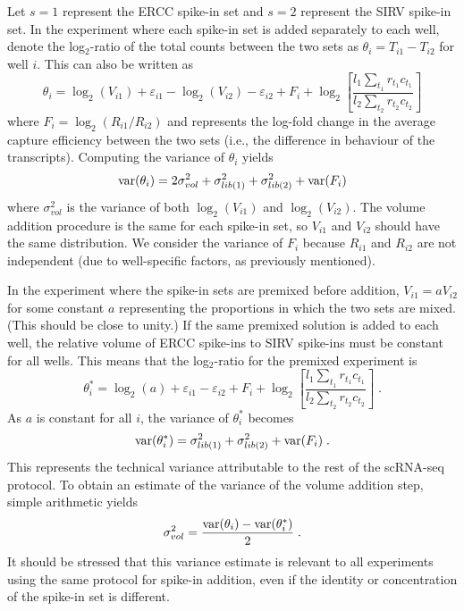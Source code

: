 \documentclass{article}
\begin{document}
Let $s=1$ represent the ERCC spike-in set and $s=2$ represent the SIRV spike-in set.
In the experiment where each spike-in set is added separately to each well, denote the log$_2$-ratio of the total counts between the two sets as $\theta_i = T_{i1} - T_{i2}$ for well $i$.
This can also be written as
\[
    \theta_i = \log_2(V_{i1}) + \varepsilon_{i1} - \log_2(V_{i2}) - \varepsilon_{i2} + F_i + \log_2\left[ \frac{l_1 \sum_{t_1} r_{t_1} c_{t_1}}{l_2\sum_{t_2} r_{t_2} c_{t_2}} \right]
\]
where $F_i = \log_2(R_{i1}/R_{i2})$ and represents the log-fold change in the average capture efficiency between the two sets (i.e., the difference in behaviour of the transcripts).
Computing the variance of $\theta_i$ yields
\[
\mbox{var}(\theta_i) = 2 \sigma^2_{vol} + \sigma^2_{lib(1)} + \sigma^2_{lib(2)} + \mbox{var}(F_i)
\]
where $\sigma^2_{vol}$ is the variance of both $\log_2(V_{i1})$ and $\log_2(V_{i2})$.
The volume addition procedure is the same for each spike-in set, so $V_{i1}$ and $V_{i2}$ should have the same distribution.
We consider the variance of $F_i$ because $R_{i1}$ and $R_{i2}$ are not independent (due to well-specific factors, as previously mentioned).

In the experiment where the spike-in sets are premixed before addition, $V_{i1}=aV_{i2}$ for some constant $a$ representing the proportions in which the two sets are mixed.
(This should be close to unity.)
If the same premixed solution is added to each well, the relative volume of ERCC spike-ins to SIRV spike-ins must be constant for all wells.
This means that the log$_2$-ratio for the premixed experiment is 
\[
    \theta^*_i = \log_2(a) + \varepsilon_{i1} - \varepsilon_{i2} + F_i + \log_2\left[ \frac{l_1 \sum_{t_1} r_{t_1} c_{t_1}}{l_2\sum_{t_2} r_{t_2} c_{t_2}} \right] \;.
\]
As $a$ is constant for all $i$, the variance of $\theta^*_i$ becomes
\[
\mbox{var}(\theta^*_i) = \sigma^2_{lib(1)} + \sigma^2_{lib(2)} + \mbox{var}(F_i) \;.
\]
This represents the technical variance attributable to the rest of the scRNA-seq protocol.
To obtain an estimate of the variance of the volume addition step, simple arithmetic yields
\[
\sigma^2_{vol} = \frac{\mbox{var}(\theta_i) - \mbox{var}(\theta^*_i)}{2} \;.
\]
It should be stressed that this variance estimate is relevant to all experiments using the same protocol for spike-in addition, even if the identity or concentration of the spike-in set is different.
\end{document}
